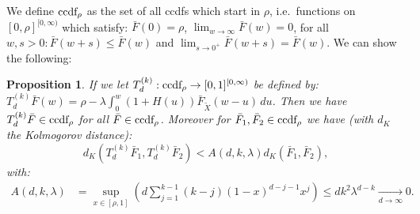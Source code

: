 \documentclass[12pt]{report}
\newtheorem{remark}{Remark}
\newtheorem{proposition}[theorem]{Proposition}
\begin{document}


We define $\textup{ccdf}_{\rho}$ as the set of all ccdfs which start in $\rho$, i.e.~functions on $[0,\rho]^{[0,\infty)}$ which satisfy: $\bar F(0)=\rho$, $\lim_{w\rightarrow \infty} \bar F(w) = 0$, for all $ w,s>0: \bar F(w+s) \leq \bar F(w)$ and $\lim_{s\rightarrow 0^+}\bar F(w+s)=\bar F(w)$. We can show the following:
\begin{proposition}\label{prop:LLdk2}
If we let $T_d^{(k)}:\textup{ccdf}_{\rho}\rightarrow [0,1]^{[0,\infty)}$ be defined by: $T_d^{(k)}\bar F(w) =\rho - \lambda \int_0^w (1+H(u)) \bar F_{\tilde{X}}(w-u)\, du$. Then we have $T_d^{(k)} \bar F \in \textup{ccdf}_{\rho}$ for all $\bar F\in \textup{ccdf}_{\rho}$. Moreover for $\bar F_1, \bar F_2 \in \textup{ccdf}_{\rho}$ we have (with $d_K$ the Kolmogorov distance):
\begin{equation} \label{eq:ineq_d_K}
d_K(T_d^{(k)}\bar F_1, T_d^{(k)} \bar F_2) < A(d,k,\lambda) d_K(\bar F_1, \bar F_2),
\end{equation}
with:
\begin{align*}
A(d,k,\lambda) &= \sup_{x\in [\rho,1]} \left(d \sum_{j=1}^{k-1} (k-j) (1-x)^{d-j-1}x^j \right) \leq d k ^2 \lambda^{d-k} \underset{d\rightarrow \infty}{\longrightarrow} 0.
\end{align*}
\end{proposition}
\end{document}
